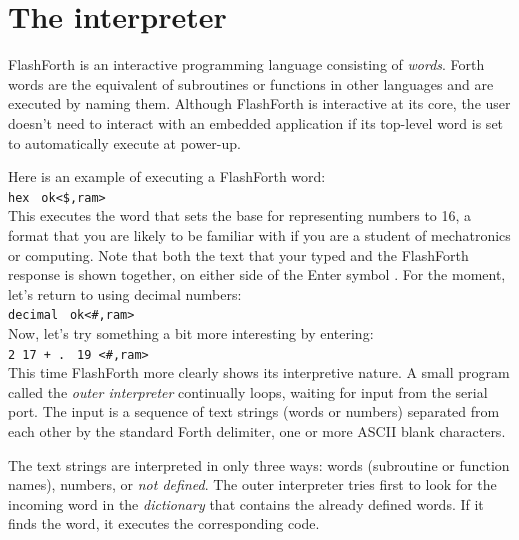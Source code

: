 \documentclass[12pt,a4paper]{article}
\begin{document}
\newpage
\section{The interpreter}
\label{sec:interpreter}
%
FlashForth is an interactive programming language consisting of \textit{words}.
Forth words are the equivalent of subroutines or functions in other languages and are
executed by naming them.
Although FlashForth is interactive at its core, the user doesn't need to
interact with an embedded application if its top-level word is set to automatically
execute at power-up.

\medskip
Here is an example of executing a FlashForth word: \vspace{7pt} \\
\verb!hex ! \fbox{$\hookleftarrow$} \verb!ok<$,ram>! \vspace{7pt} \\
This executes the word that sets the base for representing numbers to 16, 
a format that you are likely to be familiar with
if you are a student of mechatronics or computing.
Note that both the text that your typed and the FlashForth response is shown
together, on either side of the Enter symbol \fbox{$\hookleftarrow$}.
For the moment, let's return to using decimal numbers: \vspace{7pt} \\
\verb!decimal ! \fbox{$\hookleftarrow$} \verb!ok<#,ram>! \vspace{7pt} \\

\medskip
Now, let's try something a bit more interesting by entering: \vspace{7pt} \\
\verb!2 17 + . ! \fbox{$\hookleftarrow$} \verb!19 <#,ram>! \vspace{7pt} \\
This time FlashForth more clearly shows its interpretive nature.
A small program called the \textit{outer interpreter} continually loops,
waiting for input from the serial port.
The input is a sequence of text strings (words or numbers) separated from each other
by the standard Forth delimiter, one or more ASCII blank characters.

\medskip
The text strings are interpreted in only three ways: words (subroutine or function names),
numbers, or \textit{not defined}.
The outer interpreter tries first to look for the incoming word in the \textit{dictionary}
that contains the already defined words.
If it finds the word, it executes the corresponding code.
\end{document}
